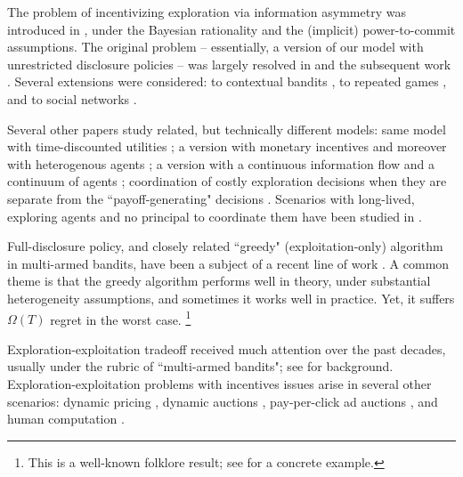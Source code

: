 The problem of incentivizing exploration via information asymmetry was introduced in \cite{Kremer-JPE14}, under the Bayesian rationality and the (implicit) power-to-commit assumptions. The original problem -- essentially, a version of our model with unrestricted disclosure policies -- was largely resolved in \cite{Kremer-JPE14} and the subsequent work \cite{ICexploration-ec15,ICexplorationGames-ec16}. Several extensions were considered: to contextual bandits \cite{ICexploration-ec15}, to repeated games
\cite{ICexplorationGames-ec16}, and to social networks \cite{Bahar-ec16}.

Several other papers study related, but technically different models: same model with time-discounted utilities \cite{Bimpikis-exploration-ms17}; a version with monetary incentives \cite{Frazier-ec14} and moreover with heterogenous agents \cite{Kempe-colt18}; a version with a continuous information flow and a continuum of agents \cite{Che-13}; coordination of costly exploration decisions when they are separate from the ``payoff-generating" decisions \cite{Bobby-Glen-ec16,Annie-ec18-traps,Liang-ec18}. Scenarios with long-lived, exploring agents and no principal to coordinate them have been studied in \cite{Bolton-econometrica99,Keller-econometrica05}.

Full-disclosure policy, and closely related ``greedy" (exploitation-only) algorithm in multi-armed bandits, have been a subject of a recent line of work \cite{Sven-aistats18,kannan2018smoothed,bastani2017exploiting,externalities-colt18,practicalCB-arxiv18}.
A common theme is that the greedy algorithm performs well in theory, under  substantial heterogeneity assumptions, and sometimes it works well in practice. Yet, it suffers $\Omega(T)$ regret in the worst case.%
\footnote{This is a well-known folklore result; \eg see \cite{CompetingBandits-itcs18} for a concrete example.}

Exploration-exploitation tradeoff received much attention over the past decades, usually under the rubric of ``multi-armed bandits"; see  \cite{Bubeck-survey12,Gittins-book11} for background.
Exploration-exploitation problems with incentives issues arise in several other scenarios: dynamic pricing
    \cite{KleinbergL03,BZ09,BwK-focs13},
dynamic auctions
    \cite{AtheySegal-econometrica13,DynPivot-econometrica10,Kakade-pivot-or13},
pay-per-click ad auctions
    \cite{MechMAB-ec09,DevanurK09,Transform-ec10-jacm},
and human computation
    \cite{RepeatedPA-ec14,Ghosh-itcs13,Krause-www13}.
